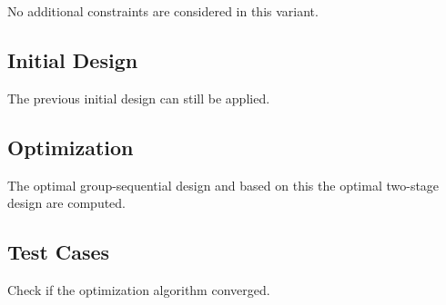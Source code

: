 \documentclass[]{book}
\newenvironment{Shaded}{\begin{snugshade}}{\end{snugshade}}
\newcommand{\ControlFlowTok}[1]{\textcolor[rgb]{0.13,0.29,0.53}{\textbf{#1}}}
\newcommand{\DataTypeTok}[1]{\textcolor[rgb]{0.13,0.29,0.53}{#1}}
\newcommand{\DecValTok}[1]{\textcolor[rgb]{0.00,0.00,0.81}{#1}}
\newcommand{\KeywordTok}[1]{\textcolor[rgb]{0.13,0.29,0.53}{\textbf{#1}}}
\newcommand{\NormalTok}[1]{#1}
\newcommand{\OperatorTok}[1]{\textcolor[rgb]{0.81,0.36,0.00}{\textbf{#1}}}
\newcommand{\StringTok}[1]{\textcolor[rgb]{0.31,0.60,0.02}{#1}}
\begin{document}
No additional constraints are considered in this variant.

\hypertarget{initial-design-3}{%
\subsection{Initial Design}\label{initial-design-3}}

The previous initial design can still be applied.

\hypertarget{optimization-4}{%
\subsection{Optimization}\label{optimization-4}}

The optimal group-sequential design and based on this the
optimal two-stage design are computed.

\begin{Shaded}
\end{Shaded}

\hypertarget{test-cases-4}{%
\subsection{Test Cases}\label{test-cases-4}}

Check if the optimization algorithm converged.

\begin{Shaded}
\end{Shaded}
\end{document}

